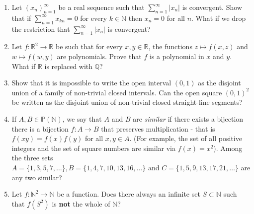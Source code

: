 \documentclass[12pt,a4paper]{article}
\newcommand\R{\mathbb{R}}
\newcommand\N{\mathbb{N}}
\newcommand\Q{\mathbb{Q}}
\newcommand\seq[1]{(#1 _{n})_{n=1}^{\infty}}
\begin{document}
\begin{enumerate}
		\item Let $\seq{x}$ be a real sequence such that $\sum_{n=1}^{\infty} \lvert x_{n} \rvert$ is convergent. Show that if $\sum_{n=1}^{\infty} x_{kn} = 0$ for every $k \in \N$ then $x_n = 0$ for all $n$. What if we drop the restriction that $\sum_{n=1}^{\infty} \lvert x_{n} \rvert$ is convergent?
		\item Let $f: \R^{2} \to \R$ be such that for every $x,y \in \R$, the functions $z \mapsto f(x,z)$ and $w \mapsto f(w,y)$ are polynomials. Prove that $f$ is a polynomial in $x$ and $y$. What if $\R$ is replaced with $\Q$?
		\item Show that it is impossible to write the open interval $(0,1)$ as the disjoint union of a family of non-trivial closed intervals. Can the open square $(0,1)^{2}$ be written as the disjoint union of non-trivial closed straight-line segments?
		\item If $A, B \in \mathbb{P} ( \N)$, we say that $A$ and $B$ are \textit{similar} if there exists a bijection there is a bijection $f: A \to B$ that preserves multiplication - that is $f(xy) = f(x)f(y)$ for all $x,y \in A$. (For example, the set of all positive integers and the set of square numbers are similar via $f(x) = x^{2}$). Among the three sets $A = \{1,3,5,7,\dots\}, B=\{1,4,7,10,13,16,\dots\}  \text{ and } C = \{1,5,9,13,17,21,\dots\}$  are any two similar?
		\item Let $f : \N^{2} \to \N$ be a function. Does there always an infinite set $S \subset \N$ such that $f(S^{2})$ is \textbf{not} the whole of $\N$?
		
	
		\end{enumerate}
	
\end{document}
